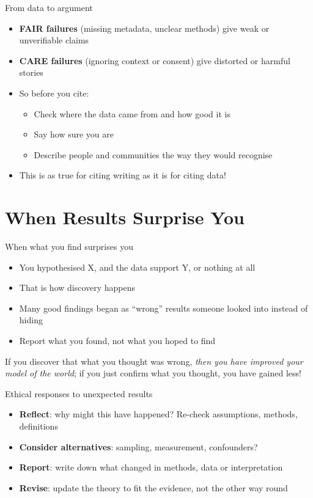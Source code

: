 \documentclass[aspectratio=169]{beamer}
\begin{document}
\begin{frame}{From data to argument}
\begin{itemize}
  \item \textbf{FAIR failures} (missing metadata, unclear methods) give weak or unverifiable claims
  \item \textbf{CARE failures} (ignoring context or consent) give distorted or harmful stories
  \item So before you cite:
    \begin{itemize}
      \item Check where the data came from and how good it is
      \item Say how sure you are
      \item Describe people and communities the way they would recognise
    \end{itemize}
  \item This is as true for citing writing as it is for citing data!
\end{itemize}

\end{frame}


\section{When Results Surprise You}

\begin{frame}{When what you find surprises you}
\begin{itemize}
  \item You hypothesised X, and the data support Y, or nothing at all
  \item That is how discovery happens
  \item Many good findings began as ``wrong'' results someone looked into instead of hiding
  \item Report what you found, not what you hoped to find
\end{itemize}
If you discover that what you thought was wrong, \emph{then you have improved your model of the world}; if you just confirm what you thought, you have gained less!
\end{frame}

\begin{frame}{Ethical responses to unexpected results}
\begin{itemize}
  \item \textbf{Reflect}: why might this have happened? Re-check assumptions, methods, definitions
  \item \textbf{Consider alternatives}: sampling, measurement, confounders?
  \item \textbf{Report}: write down what changed in methods, data or interpretation
  \item \textbf{Revise}: update the theory to fit the evidence, not the other way round
\end{itemize}
\end{frame}
\end{document}
